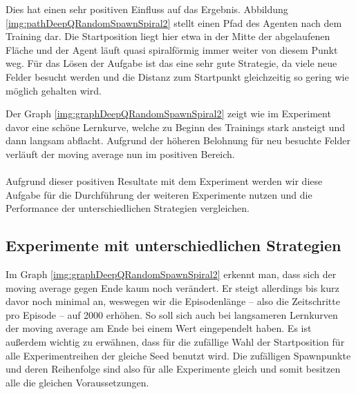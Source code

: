 Dies hat einen sehr positiven Einfluss auf das Ergebnis. Abbildung \ref{img:pathDeepQRandomSpawnSpiral2} stellt einen Pfad des Agenten nach dem Training dar. Die Startposition liegt hier etwa in der Mitte der abgelaufenen Fläche und der Agent läuft quasi spiralförmig immer weiter von diesem Punkt weg. Für das Lösen der Aufgabe ist das eine sehr gute Strategie, da viele neue Felder besucht werden und die Distanz zum Startpunkt gleichzeitig so gering wie möglich gehalten wird.

Der Graph \ref{img:graphDeepQRandomSpawnSpiral2} zeigt wie im Experiment davor eine schöne Lernkurve, welche zu Beginn des Trainings stark ansteigt und dann langsam abflacht. Aufgrund der höheren Belohnung für neu besuchte Felder verläuft der moving average nun im positiven Bereich.

\paragraph{}
Aufgrund dieser positiven Resultate mit dem Experiment werden wir diese Aufgabe für die Durchführung der weiteren Experimente nutzen und die Performance der unterschiedlichen Strategien vergleichen.

% 

\subsection{Experimente mit unterschiedlichen Strategien}
Im Graph \ref{img:graphDeepQRandomSpawnSpiral2} erkennt man, dass sich der moving average gegen Ende kaum noch verändert. Er steigt allerdings bis kurz davor noch minimal an, weswegen wir die Episodenlänge -- also die Zeitschritte pro Episode -- auf 2000 erhöhen. So soll sich auch bei langsameren Lernkurven der moving average am Ende bei einem Wert eingependelt haben. Es ist außerdem wichtig zu erwähnen, dass für die zufällige Wahl der Startposition für alle Experimentreihen der gleiche Seed benutzt wird. Die zufälligen Spawnpunkte und deren Reihenfolge sind also für alle Experimente gleich und somit besitzen alle die gleichen Voraussetzungen.


